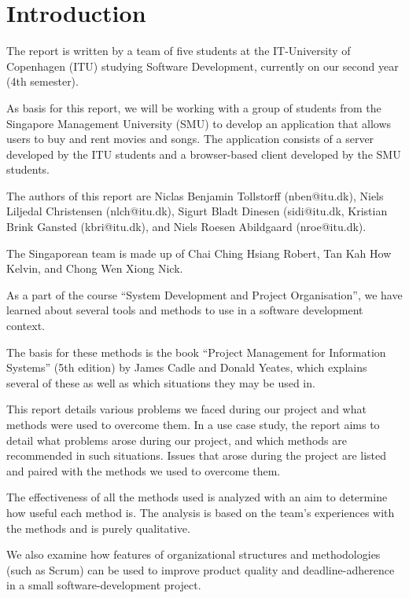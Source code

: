 \section{Introduction}

The report is written by a team of five students at the IT-University of Copenhagen (ITU) studying Software
Development, currently on our second year (4th semester).

As basis for this report, we will be working with a group of students from the Singapore
Management University (SMU) to develop an application that allows users to buy and rent
movies and songs. The application consists of a server developed by the ITU students
and a browser-based client developed by the SMU students.

The authors of this report are Niclas Benjamin Tollstorff (nben@itu.dk), Niels Liljedal
Christensen (nlch@itu.dk), Sigurt Bladt Dinesen (sidi@itu.dk, Kristian Brink Gansted
(kbri@itu.dk), and Niels Roesen Abildgaard (nroe@itu.dk).

The Singaporean team is made up of Chai Ching Hsiang Robert, Tan Kah How Kelvin, and
Chong Wen Xiong Nick.

As a part of the course “System Development and Project Organisation”, we have learned
about several tools and methods to use in a software development context.

The basis for these methods is the book “Project Management for Information Systems”
(5th edition) by James Cadle and Donald Yeates, which explains several of these as well
as which situations they may be used in.

This report details various problems we faced during our project and what
methods were used to overcome them. In a use case study, the report aims to
detail what problems arose during our project, and which methods are
recommended in such situations.  Issues that arose during the project are
listed and paired with the methods we used to overcome them.

The effectiveness of all the methods used is analyzed with an aim to determine
how useful each method is. The analysis is based on the team’s experiences with
the methods and is purely qualitative.

We also examine how features of organizational structures and methodologies
(such as Scrum) can be used to improve product quality and deadline-adherence
in a small software-development project.